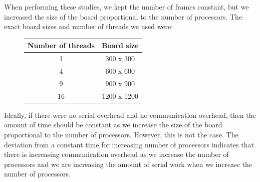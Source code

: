 \documentclass[11pt]{article}
\begin{document}
        When performing these studies, we kept the number of frames constant, but we increased the size of the board proportional to the number of processors. The exact board sizes and number of threads we used were:

        \begin{figure}[H]
            \centering
            \begin{tabular}{c | c}
            Number of threads & Board size\\
            \hline
            1 & 300 x 300\\
            4 & 600 x 600\\
            9 & 900 x 900\\
            16 & 1200 x 1200
            \end{tabular}
        \end{figure}

        Ideally, if there were no serial overhead and no communication overhead, then the amount of time should be constant as we increase the size of the board proportional to the number of processors. However, this is not the case. The deviation from a constant time for increasing number of processors indicates that there is increasing communication overhead as we increase the number of processors and we are increasing the amount of serial work when we increase the number of processors. 
\end{document}
